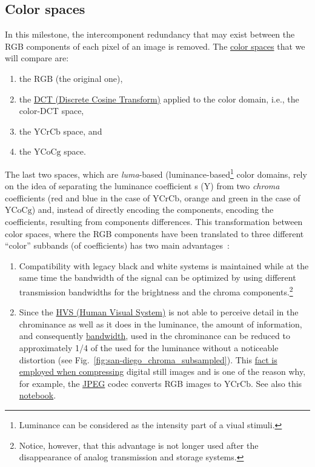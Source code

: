 \subsection{Color spaces}
In this milestone, the intercomponent redundancy that may exist
between the RGB components of each pixel of an image is removed. The
\href{https://en.wikipedia.org/wiki/Color_space}{color spaces} that we
will compare are:
\begin{enumerate}
  \item the \href{https://en.wikipedia.org/wiki/RGB_color_model}{$\text{RGB}$}
    (the original one),
  \item the
    \href{https://en.wikipedia.org/wiki/Discrete_cosine_transform}{DCT
      (Discrete Cosine Transform)} applied to the color domain, i.e.,
    the color-DCT space,
  \item the \href{https://en.wikipedia.org/wiki/YCbCr}{$\text{YCrCb}$} space, and
  \item the \href{https://en.wikipedia.org/wiki/YCoCg}{$\text{YCoCg}$} space.
\end{enumerate}
The last two spaces, which are \emph{luma}-based
(luminance-based\footnote{Luminance can be considered as the intensity
part of a viual stimuli.} color domains, rely on the idea of
separating the luminance coefficient s (Y) from two \emph{chroma}
coefficients (red and blue in the case of $\text{YCrCb}$, orange and
green in the case of $\text{YCoCg}$) and, instead of directly encoding
the components, encoding the coefficients, resulting from components
diﬀerences. This transformation between color spaces, where the RGB
components have been translated to three different ``color'' subbands
(of coefficients) has two main advantages~\cite{burger2016digital}:
\begin{enumerate}
\item Compatibility with legacy black and white systems is maintained
  while at the same time the bandwidth of the signal can be optimized
  by using diﬀerent transmission bandwidths for the brightness and the
  chroma components.\footnote{Notice, however, that this advantage is
  not longer used after the disappearance of analog transmission and
  storage systems.}
\item Since the \href{https://en.wikipedia.org/wiki/Visual_system}{HVS
  (Human Visual System)} is not able to perceive detail in the
  chrominance as well as it does in the luminance, the amount of
  information, and consequently
  \href{https://en.wikipedia.org/wiki/Bandwidth_(signal_processing)}{bandwidth},
  used in the chrominance can be reduced to approximately 1/4 of the
  used for the luminance without a noticeable distortion (see
  Fig.~\ref{fig:san-diego_chroma_subsampled}). This
  \href{https://en.wikipedia.org/wiki/Bandwidth_(computing)}{fact is
    employed when compressing} digital still images and is one of the
  reason why, for example, the
  \href{https://en.wikipedia.org/wiki/JPEG}{JPEG} codec converts RGB
  images to $\text{YCrCb}$. See also this
  \href{https://github.com/Sistemas-Multimedia/Sistemas-Multimedia.github.io/blob/master/milestones/06-YUV_compression/chroma_subsampling.ipynb}{notebook}.
\end{enumerate}

